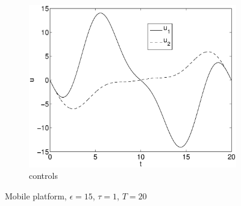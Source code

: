 \begin{figure}[h]
\begin{subfigure}[b]{\textwidth}
\centering
\includegraphics[height=0.3\textheight]{img/final_1_15_20_u.eps}
\caption{controls}
\end{subfigure}
\caption{Mobile platform, $\epsilon=15$, $\tau=1$, $T=20$}
\label{fig:pl6}
\end{figure}

